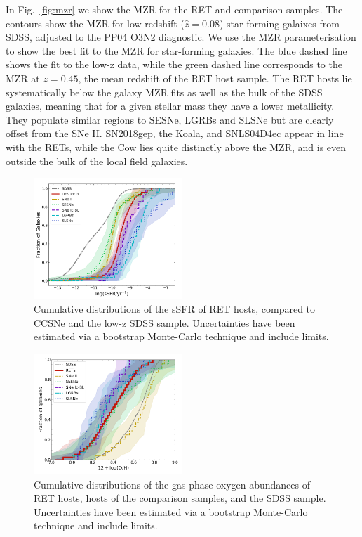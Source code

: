 \documentclass[fleqn,usenatbib,]{mnras}
\begin{document}
In Fig.~\ref{fig:mzr} we show the MZR for the RET and comparison samples. The contours show the MZR for low-redshift ($\hat{z}=0.08$) star-forming galaixes from SDSS, adjusted to the PP04 O3N2 diagnostic. We use the MZR parameterisation \citet{Zahid2014} to show the best fit to the MZR for star-forming galaxies. The blue dashed line shows the fit to the low-z data, while the green dashed line corresponds to the MZR at $z=0.45$, the mean redshift of the RET host sample. The RET hosts lie systematically below the galaxy MZR fits as well as the bulk of the SDSS galaxies, meaning that for a given stellar mass they have a lower metallicity. They populate similar regions to SESNe, LGRBs and SLSNe but are clearly offset from the SNe II. SN2018gep, the Koala, and SNLS04D4ec appear in line with the RETs, while the Cow lies quite distinctly above the MZR, and is even outside the bulk of the local field galaxies.
\begin{figure}
\includegraphics[width=0.5\textwidth]{figs/cum_sSFR_mike.png}
\caption{Cumulative distributions of the sSFR of RET hosts, compared to CCSNe and the low-z SDSS sample. Uncertainties have been estimated via a bootstrap Monte-Carlo technique and include limits.
\label{fig:ssfr_cum}}
\end{figure}
\begin{figure}
\includegraphics[width=0.5\textwidth]{figs/RET_OH_cum.png}
\caption{Cumulative distributions of the gas-phase oxygen abundances of RET hosts, hosts of the comparison samples, and the SDSS sample. Uncertainties have been estimated via a bootstrap Monte-Carlo technique and include limits.
\label{fig:oh_cum}}
\end{figure}
\end{document}
